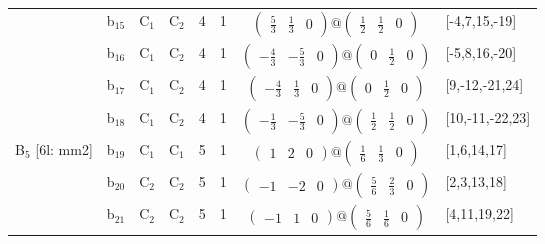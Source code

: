 \documentclass[fleqn,10pt,landscape]{article}
\begin{document}
\begin{itemize}
\begin{center}
\begin{longtable}{cc|cc|c|c|c|l}
& b$_{15}$ & C$_{1}$ & C$_{2}$ & 4 & 1 & $\begin{pmatrix} \frac{5}{3} & \frac{1}{3} & 0 \end{pmatrix}@\begin{pmatrix} \frac{1}{2} & \frac{1}{2} & 0 \end{pmatrix}$ & [-4,7,15,-19] \\
& b$_{16}$ & C$_{1}$ & C$_{2}$ & 4 & 1 & $\begin{pmatrix} - \frac{4}{3} & - \frac{5}{3} & 0 \end{pmatrix}@\begin{pmatrix} 0 & \frac{1}{2} & 0 \end{pmatrix}$ & [-5,8,16,-20] \\
& b$_{17}$ & C$_{1}$ & C$_{2}$ & 4 & 1 & $\begin{pmatrix} - \frac{4}{3} & \frac{1}{3} & 0 \end{pmatrix}@\begin{pmatrix} 0 & \frac{1}{2} & 0 \end{pmatrix}$ & [9,-12,-21,24] \\
& b$_{18}$ & C$_{1}$ & C$_{2}$ & 4 & 1 & $\begin{pmatrix} - \frac{1}{3} & - \frac{5}{3} & 0 \end{pmatrix}@\begin{pmatrix} \frac{1}{2} & \frac{1}{2} & 0 \end{pmatrix}$ & [10,-11,-22,23] \\ \hline
B$_{5}$ [6l: mm2] & b$_{19}$ & C$_{1}$ & C$_{1}$ & 5 & 1 & $\begin{pmatrix} 1 & 2 & 0 \end{pmatrix}@\begin{pmatrix} \frac{1}{6} & \frac{1}{3} & 0 \end{pmatrix}$ & [1,6,14,17] \\
& b$_{20}$ & C$_{2}$ & C$_{2}$ & 5 & 1 & $\begin{pmatrix} -1 & -2 & 0 \end{pmatrix}@\begin{pmatrix} \frac{5}{6} & \frac{2}{3} & 0 \end{pmatrix}$ & [2,3,13,18] \\
& b$_{21}$ & C$_{2}$ & C$_{2}$ & 5 & 1 & $\begin{pmatrix} -1 & 1 & 0 \end{pmatrix}@\begin{pmatrix} \frac{5}{6} & \frac{1}{6} & 0 \end{pmatrix}$ & [4,11,19,22] \\

\end{longtable}
\end{center}
\end{itemize}
\end{document}
